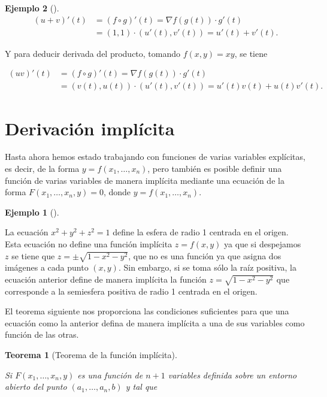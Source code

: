 \documentclass[
  a4paper,
]{scrreport}
\theoremstyle{definition}
\newtheorem{example}{Ejemplo}[chapter]
\theoremstyle{plain}
\theoremstyle{definition}
\theoremstyle{definition}
\theoremstyle{plain}
\newtheorem{theorem}{Teorema}[chapter]
\theoremstyle{plain}
\theoremstyle{remark}
\begin{document}
\begin{example}[]
\begin{align*}
(u+v)'(t) 
&= (f\circ g)'(t) = \nabla f(g(t))\cdot g'(t) \\
&= (1,1)\cdot (u'(t),v'(t)) = u'(t)+v'(t).
\end{align*}

Y para deducir derivada del producto, tomando \(f(x,y)=xy\), se tiene

\begin{align*}
(uv)'(t) 
&= (f\circ g)'(t) = \nabla f(g(t))\cdot g'(t) \\
&= (v(t),u(t))\cdot (u'(t),v'(t)) = u'(t)v(t)+u(t)v'(t).
\end{align*}

\section{Derivación implícita}\label{derivaciuxf3n-impluxedcita}

Hasta ahora hemos estado trabajando con funciones de varias variables
explícitas, es decir, de la forma \(y=f(x_1,\ldots,x_n)\), pero también
es posible definir una función de varias variables de manera implícita
mediante una ecuación de la forma \(F(x_1,\ldots,x_n, y)=0\), donde
\(y=f(x_1,\ldots,x_n)\).

\begin{example}[]\protect\hypertarget{exm-funcion-implicita-2-variables}{}\label{exm-funcion-implicita-2-variables}

La ecuación \(x^2+y^2+z^2 = 1\) define la esfera de radio 1 centrada en
el origen. Esta ecuación no define una función implícita \(z=f(x,y)\) ya
que si despejamos \(z\) se tiene que \(z=\pm\sqrt{1-x^2-y^2}\), que no
es una función ya que asigna dos imágenes a cada punto \((x,y)\). Sin
embargo, si se toma sólo la raíz positiva, la ecuación anterior define
de manera implícita la función \(z=\sqrt{1-x^2-y^2}\) que corresponde a
la semiesfera positiva de radio 1 centrada en el origen.

\end{example}

El teorema siguiente nos proporciona las condiciones suficientes para
que una ecuación como la anterior defina de manera implícita a una de
sus variables como función de las otras.

\begin{theorem}[Teorema de la función
implícita]\protect\hypertarget{thm-funcion-implicita}{}\label{thm-funcion-implicita}

Si \(F(x_1,\ldots,x_n,y)\) es una función de \(n+1\) variables definida
sobre un entorno abierto del punto \((a_1,\ldots,a_n,b)\) y tal que


\end{theorem}
\end{example}
\end{document}
